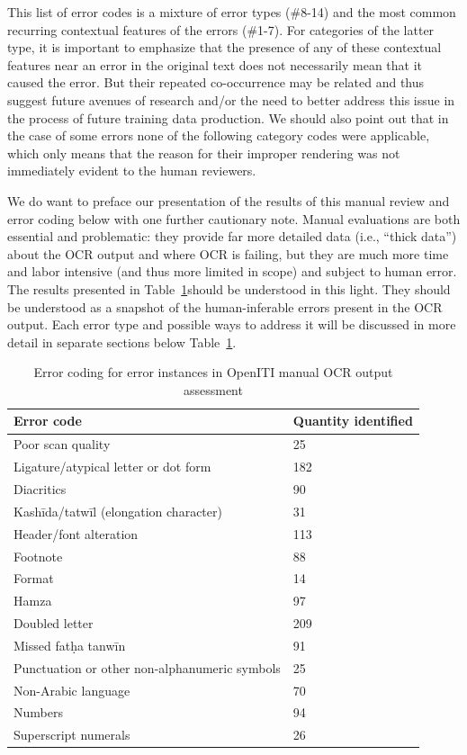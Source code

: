 This list of error codes is a mixture of error types (\#8-14) and the most
common recurring contextual features of the errors (\#1-7). For categories of
the latter type, it is important to emphasize that the presence of any of these
contextual features near an error in the original text does not necessarily
mean that it caused the error. But their repeated co-occurrence may be related
and thus suggest future avenues of research and/or the need to better address
this issue in the process of future training data production. We should also
point out that in the case of some errors none of the following category codes
were applicable, which only means that the reason for their improper rendering
was not immediately evident to the human reviewers. 

We do want to preface our presentation of the results of this manual review and
error coding below with one further cautionary note. Manual evaluations are
both essential and problematic: they provide far more detailed data (i.e.,
“thick data”) about the OCR output and where OCR is failing, but they are much
more time and labor intensive (and thus more limited in scope) and subject to
human error. The results presented in Table~\ref{tab_champs:table_3}should be understood in this
light. They should be understood as a snapshot of the human-inferable errors
present in the OCR output. Each error type and possible ways to address it will
be discussed in more detail in separate sections below Table~\ref{tab_champs:table_3}.

\begin{table}[h!]
\begin{center}
\caption{Error coding for error instances in OpenITI manual OCR output assessment}
\label{tab_champs:table_3}
\begin{tabularx}{\textwidth}{ll} \toprule
\textbf{Error code} & \textbf{Quantity identified}\\\midrule
Poor scan quality & 25\\
Ligature/atypical letter or dot form & 182\\
Diacritics & 90\\
Kashīda/tatwīl (elongation character)  &31\\
Header/font alteration &113\\
Footnote &88\\
Format &14\\
Hamza &97\\
Doubled letter &209\\
Missed fatḥa tanwīn &91\\
Punctuation or other non-alphanumeric symbols &25\\
Non-Arabic language &70\\
Numbers &94\\
Superscript numerals &26\\
\bottomrule
\end{tabularx}
\end{center}
\end{table}

